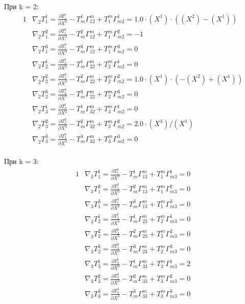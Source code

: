 \documentclass{article}
\begin{document}
При k = 2:\\
\begin{alignat*}{1}
  & \nabla_2T^1_1 = \frac{\partial T^1_1}{\partial X^2} - T^1_m\Gamma^m_{12} + T^m_1\Gamma^1_{m2} = 1.0\cdot (X^1)\cdot ((X^2) - (X^1)) \\
  & \nabla_2T^2_1 = \frac{\partial T^2_1}{\partial X^2} - T^2_m\Gamma^m_{12} + T^m_1\Gamma^2_{m2} = -1 \\
  & \nabla_2T^3_1 = \frac{\partial T^3_1}{\partial X^2} - T^3_m\Gamma^m_{12} + T^m_1\Gamma^3_{m2} = 0 \\
  & \nabla_2T^1_2 = \frac{\partial T^1_2}{\partial X^2} - T^1_m\Gamma^m_{22} + T^m_2\Gamma^1_{m2} = 0 \\
  & \nabla_2T^2_2 = \frac{\partial T^2_2}{\partial X^2} - T^2_m\Gamma^m_{22} + T^m_2\Gamma^2_{m2} = 1.0\cdot (X^1)\cdot (-(X^2) + (X^1)) \\
  & \nabla_2T^3_2 = \frac{\partial T^3_2}{\partial X^2} - T^3_m\Gamma^m_{22} + T^m_2\Gamma^3_{m2} = 0 \\
  & \nabla_2T^1_3 = \frac{\partial T^1_3}{\partial X^2} - T^1_m\Gamma^m_{32} + T^m_3\Gamma^1_{m2} = 0 \\
  & \nabla_2T^2_3 = \frac{\partial T^2_3}{\partial X^2} - T^2_m\Gamma^m_{32} + T^m_3\Gamma^2_{m2} = 2.0\cdot (X^3)/(X^1) \\
  & \nabla_2T^3_3 = \frac{\partial T^3_3}{\partial X^2} - T^3_m\Gamma^m_{32} + T^m_3\Gamma^3_{m2} = 0 
\end{alignat*}\\
При k = 3:\\
\begin{alignat*}{1}
  & \nabla_3T^1_1 = \frac{\partial T^1_1}{\partial X^3} - T^1_m\Gamma^m_{13} + T^m_1\Gamma^1_{m3} = 0 \\
  & \nabla_3T^2_1 = \frac{\partial T^2_1}{\partial X^3} - T^2_m\Gamma^m_{13} + T^m_1\Gamma^2_{m3} = 0 \\
  & \nabla_3T^3_1 = \frac{\partial T^3_1}{\partial X^3} - T^3_m\Gamma^m_{13} + T^m_1\Gamma^3_{m3} = 0 \\
  & \nabla_3T^1_2 = \frac{\partial T^1_2}{\partial X^3} - T^1_m\Gamma^m_{23} + T^m_2\Gamma^1_{m3} = 0 \\
  & \nabla_3T^2_2 = \frac{\partial T^2_2}{\partial X^3} - T^2_m\Gamma^m_{23} + T^m_2\Gamma^2_{m3} = 0 \\
  & \nabla_3T^3_2 = \frac{\partial T^3_2}{\partial X^3} - T^3_m\Gamma^m_{23} + T^m_2\Gamma^3_{m3} = 0 \\
  & \nabla_3T^1_3 = \frac{\partial T^1_3}{\partial X^3} - T^1_m\Gamma^m_{33} + T^m_3\Gamma^1_{m3} = 2 \\
  & \nabla_3T^2_3 = \frac{\partial T^2_3}{\partial X^3} - T^2_m\Gamma^m_{33} + T^m_3\Gamma^2_{m3} = 0 \\
  & \nabla_3T^3_3 = \frac{\partial T^3_3}{\partial X^3} - T^3_m\Gamma^m_{33} + T^m_3\Gamma^3_{m3} = 0 
\end{alignat*}\\
\end{document}
